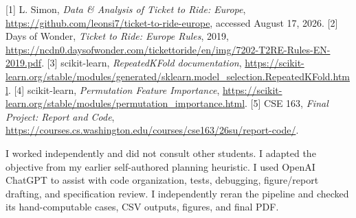 \documentclass[11pt]{article}
\begin{document}
[1] L. Simon, \textit{Data \& Analysis of Ticket to Ride: Europe},
\url{https://github.com/leonsi7/ticket-to-ride-europe}, accessed August 17,
2026. [2] Days of Wonder, \textit{Ticket to Ride: Europe Rules}, 2019,
\url{https://ncdn0.daysofwonder.com/tickettoride/en/img/7202-T2RE-Rules-EN-2019.pdf}.
[3] scikit-learn, \textit{RepeatedKFold documentation},
\url{https://scikit-learn.org/stable/modules/generated/sklearn.model_selection.RepeatedKFold.html}.
[4] scikit-learn, \textit{Permutation Feature Importance},
\url{https://scikit-learn.org/stable/modules/permutation_importance.html}.
[5] CSE 163, \textit{Final Project: Report and Code},
\url{https://courses.cs.washington.edu/courses/cse163/26su/report-code/}.

I worked independently and did not consult other students. I adapted the
objective from my earlier self-authored planning heuristic. I used OpenAI
ChatGPT to assist with code organization, tests, debugging, figure/report
drafting, and specification review. I independently reran the pipeline and
checked its hand-computable cases, CSV outputs, figures, and final PDF.
\end{document}

